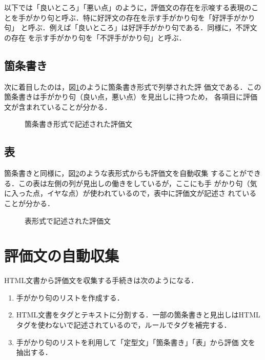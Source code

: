\documentclass[japanese]{jnlp_1.4}
\begin{document}
以下では「良いところ」「悪い点」のように，評価文の存在を示唆する表現のこ
とを手がかり句と呼ぶ．特に好評文の存在を示す手がかり句を「好評手がかり句」
と呼ぶ．例えば「良いところ」は好評手がかり句である．同様に，不評文の存在
を示す手がかり句を「不評手がかり句」と呼ぶ．


\subsection{箇条書き}

次に着目したのは，図\ref{fig:itemize}のように箇条書き形式で列挙された評
価文である．この箇条書きは手がかり句（良い点，悪い点）を見出しに持つため，
各項目に評価文が含まれていることが分かる．

\begin{figure}[b]

  \caption{箇条書き形式で記述された評価文}
  \label{fig:itemize}
\end{figure}



\subsection{表}

箇条書きと同様に，図\ref{fig:table}のような表形式からも評価文を自動収集
することができる．この表は左側の列が見出しの働きをしているが，ここにも手
がかり句（気に入った点，イヤな点）が使われているので，表中に評価文が記述さ
れていることが分かる．


\begin{figure}[b]

   \caption{表形式で記述された評価文}
   \label{fig:table}
\end{figure}




\section{評価文の自動収集}

HTML文書から評価文を収集する手続きは次のようになる．

\begin{enumerate}
 \item 手がかり句のリストを作成する．
 \item HTML文書をタグとテキストに分割する．一部の箇条書きと見出しはHTML
       タグを使わないで記述されているので，ルールでタグを補完する．
 \item 手がかり句のリストを利用して「定型文」「箇条書き」「表」から評価
       文を抽出する．
\end{enumerate}
\end{document}
